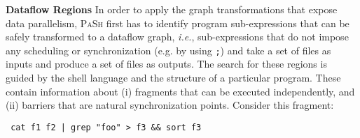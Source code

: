 \documentclass[sigplan, review, screen, anonymous]{acmart}
\newcommand{\eg}{{\em e.g.}, }
\newcommand{\ie}{{\em i.e.}, }
\newcommand{\heading}[1]{\vspace{4pt}\noindent\textbf{#1}\enspace}
\newcommand{\ttt}[1]{\texttt{#1}}
\newcommand{\kk}[1]{[{\color{magenta}kk: #1}]}
\newcommand{\sx}[1]{(\S\ref{#1})}
\newcommand{\sys}{{\scshape PaSh}\xspace}
\begin{document}
% 
% 
% 
% 
%

\heading{Dataflow Regions}
In order to apply the graph transformations that expose data parallelism, \sys first has to identify program sub-expressions that can be safely transformed to a dataflow graph, \ie sub-expressions that do not impose any scheduling or synchronization (e.g. by using \ttt{;}) and take a set of files as inputs and produce a set of files as outputs.
The search for these regions is guided by the shell language and the structure of a particular program.
These contain information about (i) fragments that can be executed independently, and (ii) barriers that are natural synchronization points. %
Consider this fragment:

\begin{verbatim}
 cat f1 f2 | grep "foo" > f3 && sort f3 
\end{verbatim}
\end{document}
